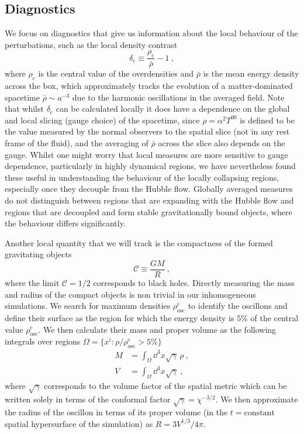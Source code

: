 \documentclass[
    reprint,
    preprintnumbers,
    superscriptaddress,
    nofootinbib,
     amsmath,amssymb,
     aps,
     prd,
    floatfix,
    ]{revtex4-2}
\newcommand{\rhoc}{\rho_\mathrm{c}}
\newcommand{\rhocosc}{\rho^\mathrm{c}_\mathrm{osc}}
\newcommand{\deltac}{\delta_\mathrm{c}}
\begin{document}
\subsection{Diagnostics}


We focus on diagnostics that give us information about the local behaviour of the perturbations, such as the local density contrast 
\begin{equation}
\deltac \equiv \frac{\rhoc}{\bar{\rho}} - 1~,
\end{equation}
where $\rhoc$ is the central value of the overdensities and $\bar{\rho}$ is the mean energy density across the box, which approximately tracks the evolution of a matter-dominated spacetime $\bar{\rho}\sim a^{-3}$ due to the harmonic oscillations in the averaged field. Note that whilst $\deltac$ can be calculated locally it does have a dependence on the global and local slicing (gauge choice) of the spacetime, since $\rho = \alpha^2 T^{00}$ is defined to be the value measured by the normal observers to the spatial slice (not in any rest frame of the fluid), and the averaging of $\bar{\rho}$ across the slice also depends on the gauge. Whilst one might worry that local measures are more sensitive to gauge dependence, particularly in highly dynamical regions, we have nevertheless found these useful in understanding the behaviour of the locally collapsing regions, especially once they decouple from the Hubble flow. Globally averaged measures do not distinguish between regions that are expanding with the Hubble flow and regions that are decoupled and form stable gravitationally bound objects, where the behaviour differs significantly.

Another local quantity that we will track is the compactness of the formed gravitating objects
\begin{equation}
    \mathcal{C}\equiv \frac{G M}{R}~,
\end{equation}
where the limit $\mathcal{C}=1/2$ corresponds to black holes. Directly measuring the mass and radius of the compact objects is non trivial in our inhomogeneous simulations. We search for maximum densities $\rhocosc$ to identify the oscillons and define their surface as the region for which the energy density is $5\%$ of the central value $\rhocosc$. We then calculate their mass and proper volume as the following integrals over regions $\Omega = \{x^i: \rho/\rhocosc>5\% \}$
\begin{align}
    M &=\int_\Omega \dd^3x\sqrt{\gamma} \,\rho~, \label{eq:M}\\
    V &=\int_\Omega \dd^3x\sqrt{\gamma} ~, \label{eq:V}
\end{align}
where $\sqrt{\gamma}$ corresponds to the volume factor of the spatial metric which can be written solely in terms of the conformal factor $\sqrt{\gamma}=\chi^{-3/2}$. We then approximate the radius of the oscillon in terms of its proper volume (in the $t= \mathrm{constant}$ spatial hypersurface of the simulation) as $R=3V^{1/3}/4\pi $.
\end{document}
